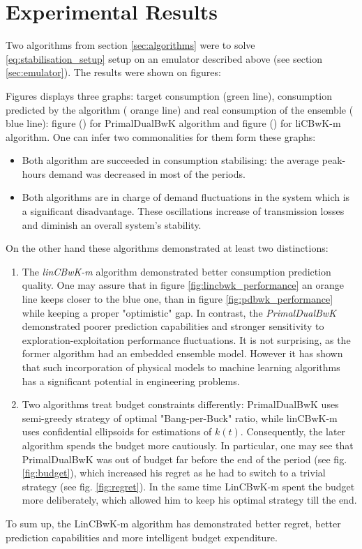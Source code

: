 \section{Experimental Results}

Two algorithms from section \ref{sec:algorithms} were to solve \ref{eq:stabilisation_setup} setup on an emulator described above (see section \ref{sec:emulator}). The results were shown on figures: 

Figures displays three graphs: target consumption ({\color{green}green line}), consumption predicted by the algorithm ({\color{orange} orange line}) and real consumption of the ensemble ({\color{blue} blue line}): figure () for PrimalDualBwK algorithm and figure () for liCBwK-m algorithm. One can infer two commonalities for them form these graphs:
\begin{itemize}
    \item Both algorithm are succeeded in consumption stabilising: the average peak-hours demand was decreased in most of the periods. 
    \item Both algorithms are in charge of demand fluctuations in the system which is a significant disadvantage. These oscillations increase of transmission losses and diminish an overall system's stability.
\end{itemize}

On the other hand these algorithms demonstrated at least two distinctions: 
\begin{enumerate}
    \item The \textit{linCBwK-m} algorithm demonstrated better consumption prediction quality. One may assure that in figure \ref{fig:lincbwk_performance} an orange line keeps closer to the blue one, than in figure \ref{fig:pdbwk_performance} while keeping a proper "optimistic" gap. In contrast, the \textit{PrimalDualBwK} demonstrated poorer prediction capabilities and stronger sensitivity to exploration-exploitation performance fluctuations. It is not surprising, as the former algorithm had an embedded ensemble model. However it has shown that such incorporation of physical models to machine learning algorithms has a significant potential in engineering problems. 
    \item Two algorithms treat budget constraints differently: PrimalDualBwK uses semi-greedy strategy of optimal "Bang-per-Buck" ratio, while linCBwK-m uses confidential ellipsoids for estimations of $k(t)$. Consequently, the later algorithm spends the budget more cautiously. In particular, one may see that PrimalDualBwK was out of budget far before the end of the period (see fig. \ref{fig:budget}), which increased his regret as he had to switch to a trivial strategy (see fig. \ref{fig:regret}). In the same time LinCBwK-m spent the budget more deliberately, which allowed him to keep his optimal strategy till the end.
\end{enumerate}
To sum up, the LinCBwK-m algorithm has demonstrated better regret, better prediction capabilities and more intelligent budget expenditure.

